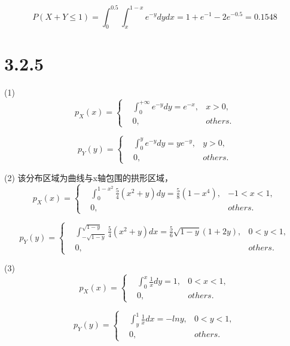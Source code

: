 \documentclass{article}
\begin{document}
$$P(X+Y\leq1)=\int^{0.5}_{0}\int^{1-x}_{x}e^{-y}dydx=1+e^{-1}-2e^{-0.5}=0.1548$$



\section{3.2.5}

(1)
\begin{equation}
p_X(x)=\left\{
\begin{aligned}
&\int^{+\infty}_{0}e^{-y}dy=e^{-x},&x>0,\\
&0,&others.
\end{aligned}
\right.
\end{equation}

\begin{equation}
p_Y(y)=\left\{
\begin{aligned}
&\int^{y}_{0}e^{-y}dy=ye^{-y},&y>0,\\
&0,&others.
\end{aligned}
\right.
\end{equation}

(2)
该分布区域为曲线与x轴包围的拱形区域，
\begin{equation}
p_X(x)=\left\{
\begin{aligned}
&\int^{1-x^2}_{0}\frac54(x^2+y)dy=\frac58(1-x^4),&-1<x<1,\\
&0,&others.
\end{aligned}
\right.
\end{equation}

\begin{equation}
p_Y(y)=\left\{
\begin{aligned}
&\int^{\sqrt{1-y}}_{-\sqrt{1-y}}\frac54(x^2+y)dx=\frac56\sqrt{1-y}(1+2y),&0<y<1,\\
&0,&others.
\end{aligned}
\right.
\end{equation}

(3)
\begin{equation}
p_X(x)=\left\{
\begin{aligned}
&\int^{x}_{0}\frac1xdy=1,&0<x<1,\\
&0,&others.
\end{aligned}
\right.
\end{equation}

\begin{equation}
p_Y(y)=\left\{
\begin{aligned}
&\int^{1}_{y}\frac1xdx=-lny,&0<y<1,\\
&0,&others.
\end{aligned}
\right.
\end{equation}
\end{document}
